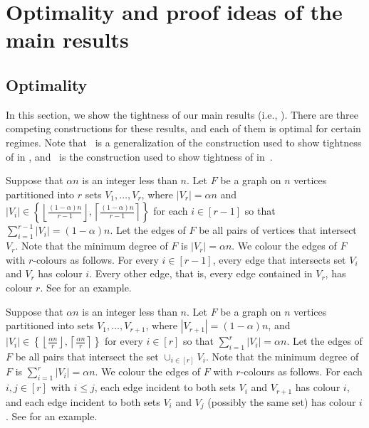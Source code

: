 \documentclass[10pt,a4paper,reqno]{amsart}
\begin{document}
\bigskip \section{Optimality and proof ideas of the main results}\label{sec:optimality}
\subsection{Optimality}

In this section, we show the tightness of our main results (i.e., ). There are three competing constructions for these results, and each of them is optimal for certain regimes. Note that~ is a generalization of the construction used to show tightness of  in \cite{Freschi2021a,Gishboliner2022discrepancies}, and~ is the construction used to show tightness of  in~\cite{Gishboliner2021colourbiased}.

\begin{con}\label{construction:small_alpha} Suppose that $\alpha n$ is an integer less than $n$. Let $F$ be a graph on $n$ vertices partitioned into $r$ sets $V_1, \dots, V_r$, where $|V_r| = \alpha n$ and  $|V_i| \in \left\{\left\lfloor\frac{(1 - \alpha) n}{r - 1}\right\rfloor, \left\lceil\frac{(1 - \alpha) n}{r - 1}\right\rceil\right\}$ for each $i \in [r-1]$ so that $\sum_{i=1}^{r-1} |V_i| = (1-\alpha)n$. Let the edges of $F$ be all pairs of vertices that intersect $V_r$. Note that the minimum degree of $F$ is $|V_r| = \alpha n$.
We colour the edges of $F$ with $r$-colours as follows. For every $i \in [r - 1]$, every edge that intersects set $V_i$ and $V_r$ has colour $i$. Every other edge, that is, every edge contained in $V_r$, has colour $r$. See  for an example.
\end{con}

\begin{con}\label{construction:med_alpha}
Suppose that $\alpha n$ is an integer less than $n$. Let $F$ be a graph on $n$ vertices partitioned into sets $V_1, \dots, V_{r + 1}$, where $|V_{r+1}| = (1 - \alpha)n$, and $|V_i| \in \left\{\left\lfloor\frac{\alpha n}{r}\right\rfloor, \left\lceil\frac{\alpha n}{r}\right\rceil\right\}$ for every $i \in [r]$ so that $\sum_{i=1}^{r} |V_i| = \alpha n$. Let the edges of $F$ be all pairs that intersect the set $\cup_{i \in [r]} V_i$. Note that the minimum degree of $F$ is $\sum_{i=1}^{r} |V_i| = \alpha n$.
We colour the edges of $F$ with $r$-colours as follows.  For each $i, j \in [r]$ with $i \leq j$, each edge incident to both sets $V_i$ and $V_{r + 1}$ has colour $i$, and each edge incident to both sets $V_i$ and $V_j$ (possibly the same set) has colour $i$. See  for an example.
\end{con}
\end{document}
